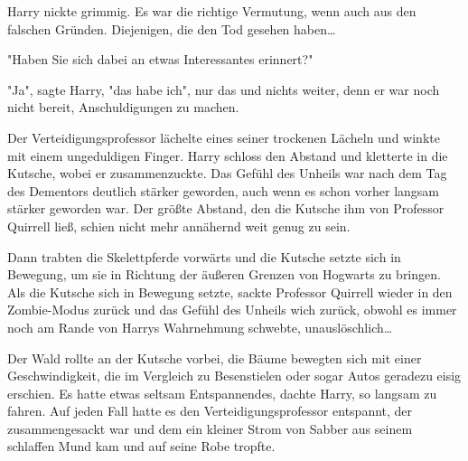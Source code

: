 {Harry nickte grimmig. Es war die richtige Vermutung, wenn auch aus den falschen Gründen. Diejenigen, die den Tod gesehen haben…

"Haben Sie sich dabei an etwas Interessantes erinnert?"

"Ja", sagte Harry, "das habe ich", nur das und nichts weiter, denn er war noch nicht bereit, Anschuldigungen zu machen.

Der Verteidigungsprofessor lächelte eines seiner trockenen Lächeln und winkte mit einem ungeduldigen Finger. Harry schloss den Abstand und kletterte in die Kutsche, wobei er zusammenzuckte. Das Gefühl des Unheils war nach dem Tag des Dementors deutlich stärker geworden, auch wenn es schon vorher langsam stärker geworden war. Der größte Abstand, den die Kutsche ihm von Professor Quirrell ließ, schien nicht mehr annähernd weit genug zu sein.

Dann trabten die Skelettpferde vorwärts und die Kutsche setzte sich in Bewegung, um sie in Richtung der äußeren Grenzen von Hogwarts zu bringen. Als die Kutsche sich in Bewegung setzte, sackte Professor Quirrell wieder in den Zombie-Modus zurück und das Gefühl des Unheils wich zurück, obwohl es immer noch am Rande von Harrys Wahrnehmung schwebte, unauslöschlich…

Der Wald rollte an der Kutsche vorbei, die Bäume bewegten sich mit einer Geschwindigkeit, die im Vergleich zu Besenstielen oder sogar Autos geradezu eisig erschien. Es hatte etwas seltsam Entspannendes, dachte Harry, so langsam zu fahren. Auf jeden Fall hatte es den Verteidigungsprofessor entspannt, der zusammengesackt war und dem ein kleiner Strom von Sabber aus seinem schlaffen Mund kam und auf seine Robe tropfte.

}
